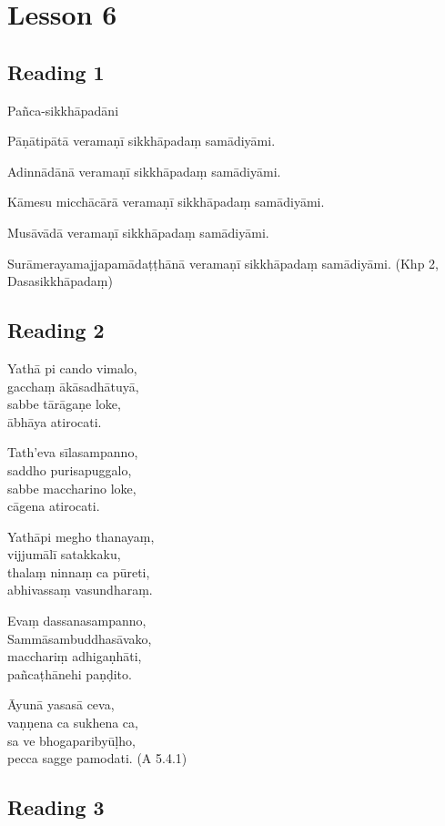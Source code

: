 \chapter{Lesson 6}

\section*{Reading 1}

Pañca-sikkhāpadāni

Pāṇātipātā veramaṇī sikkhāpadaṃ samādiyāmi.

Adinnādānā veramaṇī sikkhāpadaṃ samādiyāmi.

Kāmesu micchācārā veramaṇī sikkhāpadaṃ samādiyāmi.

Musāvādā veramaṇī sikkhāpadaṃ samādiyāmi.

Surāmerayamajjapamādaṭṭhānā veramaṇī sikkhāpadaṃ samādiyāmi. \hfill(Khp 2, Dasasikkhāpadaṃ)

\section*{Reading 2}

Yathā pi cando vimalo,\\
gacchaṃ ākāsadhātuyā,\\
sabbe tārāgaṇe loke,\\
ābhāya atirocati.

Tath’eva sīlasampanno,\\
saddho purisapuggalo,\\
sabbe maccharino loke,\\
cāgena atirocati.

Yathāpi megho thanayaṃ,\\
vijjumālī satakkaku,\\
thalaṃ ninnaṃ ca pūreti,\\
abhivassaṃ vasundharaṃ.

Evaṃ dassanasampanno,\\
Sammāsambuddhasāvako,\\
macchariṃ adhigaṇhāti,\\
pañcaṭhānehi paṇḍito.

Āyunā yasasā ceva,\\
vaṇṇena ca sukhena ca,\\
sa ve bhogaparibyūḷho,\\
pecca sagge pamodati. \hfill(A 5.4.1)

\section*{Reading 3}


